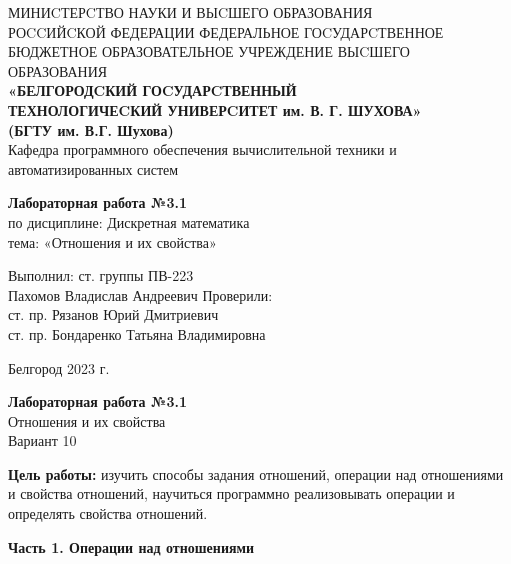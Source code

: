 \documentclass[a4paper,14pt]{extarticle}
\newcommand\textbox[1]{
	\parbox{.45\textwidth}{#1}
}
\begin{document}
\begin{center}
	\small{
		МИНИCТЕРCТВО НАУКИ И ВЫCШЕГО ОБРАЗОВАНИЯ \\РОCCИЙCКОЙ ФЕДЕРАЦИИ
		\bigbreak
		ФЕДЕРАЛЬНОЕ ГОCУДАРCТВЕННОЕ БЮДЖЕТНОЕ ОБРАЗОВАТЕЛЬНОЕ УЧРЕЖДЕНИЕ ВЫCШЕГО ОБРАЗОВАНИЯ \\
		\bigbreak
		\textbf{«БЕЛГОРОДCКИЙ ГОCУДАРCТВЕННЫЙ \\ТЕХНОЛОГИЧЕCКИЙ УНИВЕРCИТЕТ им. В. Г. ШУХОВА»\\ (БГТУ им. В.Г. Шухова)} \\
		\bigbreak
		Кафедра программного обеспечения вычислительной техники и автоматизированных систем\\}
\end{center}

\vfill
\begin{center}
	\large{
		\textbf{
			Лабораторная работа №3.1}}\\
	\normalsize{
		по дисциплине: Дискретная математика \\
		тема: «Отношения и их свойства»}
\end{center}
\vfill
\hfill\textbox{
	Выполнил: ст. группы ПВ-223\\Пахомов Владислав Андреевич
	\bigbreak
	Проверили: \\ст. пр. Рязанов Юрий Дмитриевич\\
	ст. пр. Бондаренко Татьяна Владимировна
}
\vfill\begin{center}
	Белгород 2023 г.
\end{center}
\newpage
\begin{center}
	\textbf{Лабораторная работа №3.1}\\
	Отношения и их свойства\\
	Вариант 10
\end{center}
\textbf{Цель работы: }изучить способы задания отношений, операции над отношениями и свойства отношений, научиться программно реализовывать операции и определять свойства отношений.
\begin{center} \textbf{Часть 1. Операции над отношениями} \end{center}
\end{document}

